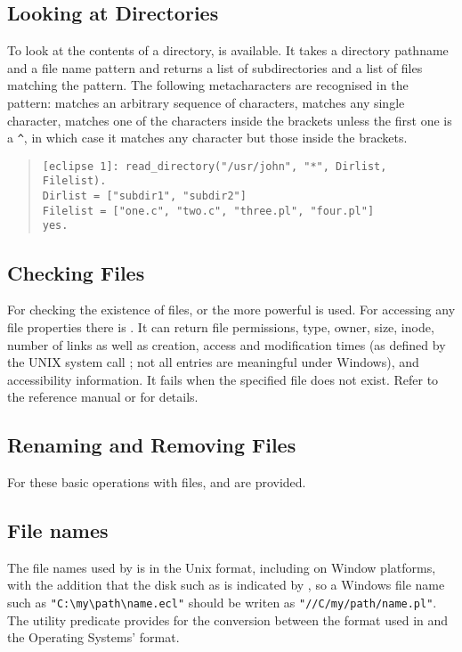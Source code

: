 \subsection{Looking at Directories}
To look at the contents of a directory,
 is
available.
It takes a directory pathname and a file name pattern and returns a list
of subdirectories and a list of files matching the pattern.
The following metacharacters are recognised in the pattern:
\notation{*} matches an arbitrary sequence of characters,
 matches any single character, \notation{[]} matches one of the
characters inside the brackets unless the first one is a \verb:^:,
in which case it matches any character but those inside the brackets.
\begin{quote}
\begin{verbatim}
[eclipse 1]: read_directory("/usr/john", "*", Dirlist, Filelist).
Dirlist = ["subdir1", "subdir2"]
Filelist = ["one.c", "two.c", "three.pl", "four.pl"]
yes.
\end{verbatim}
\end{quote}

\subsection{Checking Files}
For checking the existence of files,
 or the more powerful
 is used.
For accessing any file properties there is
.
It can return file permissions, type, owner, size, inode, number of
links as well as creation, access and modification times
(as defined by the UNIX system call ; not all entries are
meaningful under Windows), and accessibility
information.
It fails when the specified file does not exist.
Refer to the reference manual or 
for details.

\subsection{Renaming and Removing Files}
For these basic operations with files,
 and
are provided.

\subsection{File names}
The file names used by {\eclipse} is in the Unix format, including on Window
platforms, with the addition that the disk such as  is
indicated by , so a Windows file name such as
\verb+"C:\my\path\name.ecl"+ should be writen as
\verb+"//C/my/path/name.pl"+. The utility predicate
 provides for
the conversion between the format used in {\eclipse} and the Operating
Systems' format.

